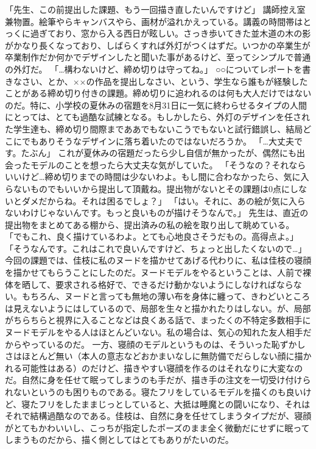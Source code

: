 「先生、この前提出した課題、もう一回描き直したいんですけど」
講師控え室兼物置。絵筆やらキャンバスやら、画材が溢れかえっている。講義の時間帯はとっくに過ぎており、窓から入る西日が眩しい。さっき歩いてきた並木道の木の影がかなり長くなっており、しばらくすれば外灯がつくはずだ。いつかの卒業生が卒業制作だか何かでデザインしたと聞いた事があるけど、至ってシンプルで普通の外灯だ。
「…構わないけど、締め切りは守ってね。」
○○についてレポートを書きなさい、とか、××の作品を提出しなさい、という、学生なら誰もが経験したことがある締め切り付きの課題。締め切りに追われるのは何も大人だけではないのだ。特に、小学校の夏休みの宿題を8月31日に一気に終わらせるタイプの人間にとっては、とても過酷な試練となる。もしかしたら、外灯のデザインを任された学生達も、締め切り間際までああでもないこうでもないと試行錯誤し、結局どこにでもありそうなデザインに落ち着いたのではないだろうか。
「…大丈夫です。たぶん」
これが夏休みの宿題だったら少し自信が無かったが、偶然にも出会ったモデルのことを想ったら大丈夫な気がしていた。
「そうなの？それならいいけど…締め切りまでの時間は少ないわよ。もし間に合わなかったら、気に入らないものでもいいから提出して頂戴ね。提出物がないとその課題は0点にしないとダメだからね。それは困るでしょ？」
「はい。それに、あの絵が気に入らないわけじゃないんです。もっと良いものが描けそうなんで。」
先生は、直近の提出物をまとめてある棚から、提出済みの私の絵を取り出して眺めている。
「でもこれ、良く描けているわよ。とても心地良さそうだもの。高得点よ。」
「そうなんです。これはこれで良いんですけど、ちょっと出したくないので…」
今回の課題では、佳枝に私のヌードを描かせてあげる代わりに、私は佳枝の寝顔を描かせてもらうことにしたのだ。ヌードモデルをやるということは、人前で裸体を晒して、要求される格好で、できるだけ動かないようにしなければならない。もちろん、ヌードと言っても無地の薄い布を身体に纏って、きわどいところは見えないようにはしているので、局部を生々と描かれたりはしない。が、局部がちらちらと視界に入ることなどは良くある話で、まったくの不特定多数相手にヌードモデルをやる人はほとんどいない。私の場合は、気心の知れた友人相手だからやっているのだ。
一方、寝顔のモデルというものは、そういった恥ずかしさはほとんど無い（本人の意志などおかまいなしに無防備でだらしない顔に描かれる可能性はある）のだけど、描きやすい寝顔を作るのはそれなりに大変なのだ。自然に身を任せて眠ってしまうのも手だが、描き手の注文を一切受け付けられないというのも困りものである。寝たフリをしているモデルを描くのも良いけど、寝たフリをしたままじっとしていると、大抵は睡魔との闘いになり、それはそれで結構過酷なのである。佳枝は、自然に身を任せてしまうタイプだが、寝顔がとてもかわいいし、こっちが指定したポーズのまま全く微動だにせずに眠ってしまうものだから、描く側としてはとてもありがたいのだ。
